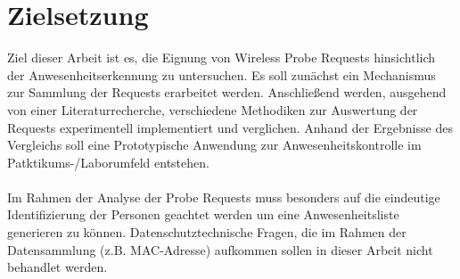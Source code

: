 \section{Zielsetzung}

Ziel dieser Arbeit ist es, die Eignung von Wireless Probe Requests hinsichtlich der Anwesenheitserkennung zu untersuchen.
Es soll zunächst ein Mechanismus zur Sammlung der Requests erarbeitet werden.
Anschließend werden, ausgehend von einer Literaturrecherche, verschiedene Methodiken zur Auswertung der Requests experimentell implementiert und verglichen.
Anhand der Ergebnisse des Vergleichs soll eine Prototypische Anwendung zur Anwesenheitskontrolle im Patktikums-/Laborumfeld entstehen.
\\
\\

Im Rahmen der Analyse der Probe Requests muss besonders auf die eindeutige Identifizierung der Personen geachtet werden um eine Anwesenheitsliste generieren zu können.
Datenschutztechnische Fragen, die im Rahmen der Datensammlung (z.B. MAC-Adresse) aufkommen sollen in dieser Arbeit nicht behandlet werden.